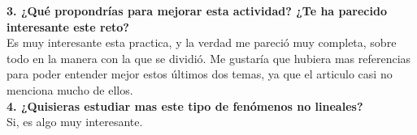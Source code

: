 \documentclass[12pt]{article}
\begin{document}
\noindent\textbf {3. ¿Qué propondrías para mejorar esta actividad? ¿Te ha parecido interesante este reto?  } \\

Es muy interesante esta practica, y la verdad me pareció muy completa, sobre todo en la manera con la que se dividió. Me gustaría que hubiera mas referencias para poder entender mejor estos últimos dos temas, ya que el articulo casi no menciona mucho de ellos. \\

\noindent\textbf {4. ¿Quisieras estudiar mas este tipo de fenómenos no lineales?} \\

Si, es algo muy interesante.
\end{document}
